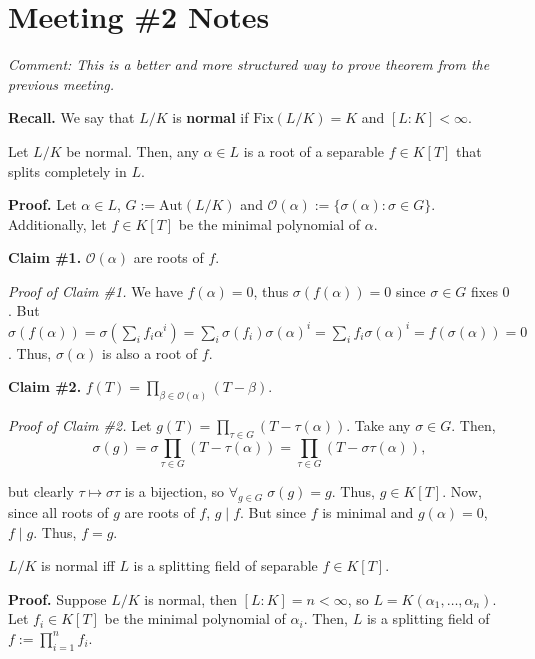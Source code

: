 \documentclass{template}
\begin{document}
\section{Meeting \#2 Notes}

\textit{Comment: This is a better and more structured way to prove theorem from the 
previous meeting.}

\textbf{Recall.} We say that $L/K$ is \textbf{normal} if $\text{Fix}(L/K) = K$
and $[L:K] < \infty$.

\begin{lemma}
    Let $L/K$ be normal. Then, any $\alpha \in L$ is a root of a separable $f
    \in K[T]$ that splits completely in $L$.
\end{lemma}

\textbf{Proof.} Let $\alpha \in L$, $G := \text{Aut}(L/K)$ and
$\mathcal{O}(\alpha) := \{\sigma(\alpha): \sigma \in G\}$. Additionally, let $f
\in K[T]$ be the minimal polynomial of $\alpha$.

\textbf{Claim \#1.} $\mathcal{O}(\alpha)$ are roots of $f$.

\textit{Proof of Claim \#1.} We have $f(\alpha)=0$, thus $\sigma(f(\alpha)) = 0$
since $\sigma \in G$ fixes $0$. But $\sigma(f(\alpha)) = \sigma(\sum_i
f_i\alpha^i) = \sum_i \sigma(f_i)\sigma(\alpha)^i = \sum_i f_i\sigma(\alpha)^i =
f(\sigma(\alpha)) = 0$. Thus, $\sigma(\alpha)$ is also a root of $f$.

\textbf{Claim \#2.} $f(T) = \prod_{\beta \in \mathcal{O}(\alpha)}(T-\beta)$.

\textit{Proof of Claim \#2.} Let $g(T) = \prod_{\tau \in G}(T-\tau(\alpha))$.
Take any $\sigma \in G$. Then,
\begin{equation*}
    \sigma(g) = \sigma\prod_{\tau \in G}(T-\tau(\alpha)) = \prod_{\tau \in G}(T - \sigma\tau(\alpha)),
\end{equation*}

but clearly $\tau \mapsto \sigma\tau$ is a bijection, so $\forall_{g \in
G}\;\sigma(g) = g$. Thus, $g \in K[T]$. Now, since all roots of $g$ are roots of
$f$, $g \mid f$. But since $f$ is minimal and $g(\alpha)=0$, $f \mid g$. Thus,
$f=g$.

\begin{theorem}
    $L/K$ is normal iff $L$ is a splitting field of separable $f \in K[T]$.
\end{theorem}

\textbf{Proof.} Suppose $L/K$ is normal, then $[L:K]=n<\infty$, so
$L=K(\alpha_1,\dots,\alpha_n)$. Let $f_i \in K[T]$ be the minimal polynomial of
$\alpha_i$. Then, $L$ is a splitting field of $f := \prod_{i=1}^n f_i$. 
\end{document}

